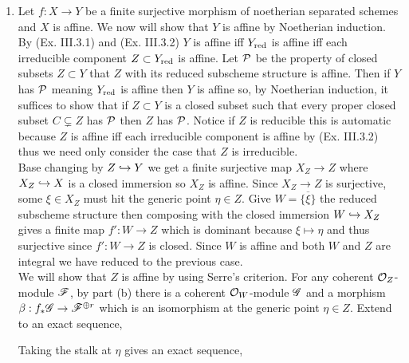 \documentclass[12pt]{article}
\begin{document}
\begin{enumerate}
\item Let $f : X \to Y$ be a finite surjective morphism of noetherian separated schemes and $X$ is affine. We now will show that $Y$ is affine by Noetherian induction. By (Ex. III.3.1) and (Ex. III.3.2) $Y$ is affine iff $Y_{\mathrm{red}}$ is affine iff each irreducible component $Z \subset Y_{\mathrm{red}}$ is affine. Let $\mathcal{P}$ be the property of closed subsets $Z \subset Y$ that $Z$ with its reduced subscheme structure is affine. Then if $Y$ has $\mathcal{P}$ meaning $Y_{\mathrm{red}}$ is affine then $Y$ is affine so, by Noetherian induction, it suffices to show that if $Z \subset Y$ is a closed subset such that every proper closed subset $C \subsetneq Z$ has $\mathcal{P}$ then $Z$ has $\mathcal{P}$. Notice if $Z$ is reducible this is automatic because $Z$ is affine iff each irreducible component is affine by (Ex. III.3.2) thus we need only consider the case that $Z$ is irreducible.
\bigskip\\
Base changing by $Z \hookrightarrow Y$ we get a finite surjective map $X_Z \to Z$ where $X_Z \hookrightarrow X$ is a closed immersion so $X_Z$ is affine. Since $X_Z \to Z$ is surjective, some $\xi \in X_Z$ must hit the generic point $\eta \in Z$. Give $W = \overline{\{ \xi \}}$ the reduced subscheme structure then composing with the closed immersion $W \hookrightarrow X_Z$ gives a finite map $f' : W \to Z$ which is dominant because $\xi \mapsto \eta$ and thus surjective since $f' : W \to Z$ is closed. Since $W$ is affine and both $W$ and $Z$ are integral we have reduced to the previous case.
\bigskip\\
We will show that $Z$ is affine by using Serre's criterion. For any coherent $\mathcal{O}_{Z}$-module $\mathscr{F}$, by part (b) there is a coherent $\mathcal{O}_{W}$-module $\mathscr{G}$ and a morphism $\beta : f_* \mathscr{G} \to \mathscr{F}^{\oplus r}$ which is an isomorphism at the generic point $\eta \in Z$. Extend to an exact sequence,
\begin{center}
\end{center} 
Taking the stalk at $\eta$ gives an exact sequence,
\begin{center}
\end{center} 

\end{enumerate}
\end{document}
